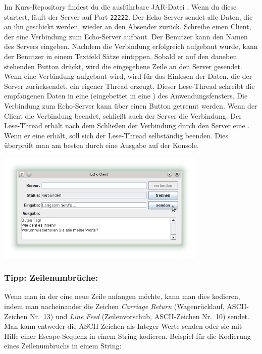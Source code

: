 Im Kurs-Repository findest du die ausführbare JAR-Datei
. Wenn du diese startest, läuft der Server auf Port
\lstinline|22222|. Der Echo-Server sendet alle Daten, die an ihn geschickt
werden, wieder an den Absender zurück. Schreibe einen Client, der eine
Verbindung zum Echo-Server aufbaut. Der Benutzer kann den Namen des Servers
eingeben. Nachdem die Verbindung erfolgreich aufgebaut wurde, kann der Benutzer
in einem Textfeld Sätze eintippen. Sobald er auf den daneben stehenden Button
drückt, wird die eingegebene Zeile an den Server gesendet. Wenn eine Verbindung
aufgebaut wird, wird für das Einlesen der Daten, die der Server zurücksendet,
ein eigener Thread erzeugt. Dieser Lese-Thread schreibt die empfangenen Daten
in eine  (eingebettet in eine ) des
Anwendungsfensters. Die Verbindung zum Echo-Server kann über
einen Button getrennt werden. Wenn der Client die Verbindung beendet, schließt
auch der Server die Verbindung. Der Lese-Thread erhält nach dem Schließen der
Verbindung durch den Server eine . Wenn er eine
 erhält, soll sich der Lese-Thread selbständig beenden.
Dies überprüft man am besten durch eine Ausgabe auf der Konsole.

\begin{center}
\includegraphics[width=0.75\textwidth]{./inf/SEKII/43_Java_ClientServer/EchoClient.png}
\end{center}

\subsubsection{Tipp: Zeilenumbrüche:}

Wenn man in der  eine neue Zeile anfangen möchte, kann man
dies kodieren, indem man nacheinander die Zeichen \emph{Carriage Return}
(Wagenrücklauf, ASCII-Zeichen Nr.\ 13) und \emph{Line Feed} (Zeilenvorschub,
ASCII-Zeichen Nr.\ 10) sendet. Man kann entweder die ASCII-Zeichen als
Integer-Werte senden oder sie mit Hilfe einer Escape-Sequenz in einem String
kodieren. Beispiel für die Kodierung eines Zeilenumbruchs in einem String:

